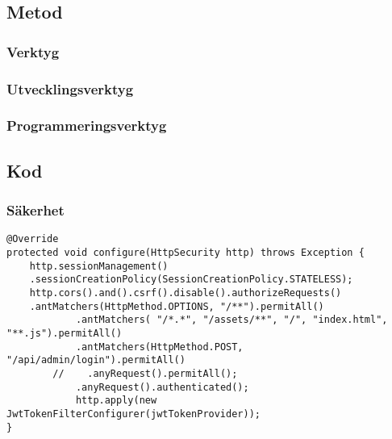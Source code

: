 \documentclass{article}
\begin{document}
    \subsection{Metod}
        \subsubsection{Verktyg}
            \subsubsection{Utvecklingsverktyg}
            \subsubsection{Programmeringsverktyg}
    \subsection{Kod}
        \subsubsection{Säkerhet}
        \begin{lstlisting}
@Override
protected void configure(HttpSecurity http) throws Exception {
    http.sessionManagement()
    .sessionCreationPolicy(SessionCreationPolicy.STATELESS);
    http.cors().and().csrf().disable().authorizeRequests()
    .antMatchers(HttpMethod.OPTIONS, "/**").permitAll()
            .antMatchers( "/*.*", "/assets/**", "/", "index.html", "**.js").permitAll()
            .antMatchers(HttpMethod.POST, "/api/admin/login").permitAll()
        //    .anyRequest().permitAll();
            .anyRequest().authenticated();
            http.apply(new JwtTokenFilterConfigurer(jwtTokenProvider));
}
            \end{lstlisting}
\end{document}
